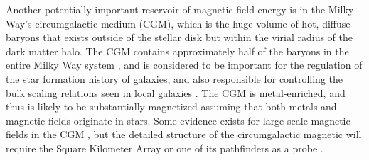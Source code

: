 Another potentially important reservoir of  magnetic field energy is in the Milky Way's
circumgalactic medium (CGM), which is the huge volume of hot, diffuse
baryons that exists outside of the stellar disk but within the virial
radius of the dark matter halo.  The CGM  contains approximately half
of the baryons in the entire Milky Way system \citep[see,
e.g.,][]{2014ApJ...786...54P}, and is considered to be important for
the regulation of the star formation history of galaxies, and also responsible for
controlling the bulk scaling relations  seen in local galaxies
\citep{2015ApJ...808L..30V,2017ApJ...845...80V}.  The CGM is
metal-enriched, and thus is likely to be
substantially magnetized assuming that both metals and magnetic fields
originate in stars.  Some evidence exists for large-scale
magnetic fields in the CGM \citep[see,
e.g., Figure 7 in][]{2017ARA&A..55..111H}, but the detailed structure
of the circumgalactic magnetic will require the Square Kilometer Array
or one of its pathfinders as a probe \citep{2015aska.confE..41H}.

